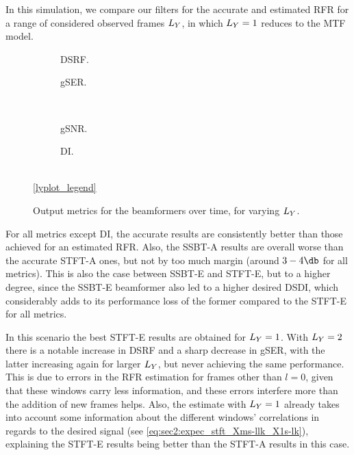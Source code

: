 In this simulation, we compare our filters for the accurate and estimated RFR for a range of considered observed frames $\Ly$, in which $\Ly = 1$ reduces to the MTF model.

\begin{figure}[!t]
	\centering
	\begin{subfigure}{0.49\textwidth}
		\centering
		
		\caption{DSRF.}
		\label{subfig:lineplot__DSRF__iSER_n15__Ly_var}
	\end{subfigure}\hfill
	\begin{subfigure}{0.49\textwidth}
		\centering
		
		\caption{gSER.}
		\label{subfig:lineplot__gSER__iSER_n15__Ly_var}
	\end{subfigure}\\[1em]
	\begin{subfigure}{0.49\textwidth}
		\centering
		
		\caption{gSNR.}
		\label{subfig:lineplot__gSNR__iSER_n15__Ly_var}
	\end{subfigure}\hfill
	\begin{subfigure}{0.49\textwidth}
		\centering
		
		\caption{DI.}
		\label{subfig:lineplot__DI__iSER_n15__Ly_var}
	\end{subfigure}\\[1em]
	\ref*{lyplot_legend}
	\caption{Output metrics for the beamformers over time, for varying $\Ly$.}
	\label{fig:lineplot__iSER_n15__Ly_var}
\end{figure}

For all metrics except DI, the accurate results are consistently better than those achieved for an estimated RFR. Also, the SSBT-A results are overall worse than the accurate STFT-A ones, but not by too much margin (around $3-4\dB$ for all metrics). This is also the case between SSBT-E and STFT-E, but to a higher degree, since the SSBT-E beamformer also led to a higher desired DSDI, which considerably adds to its performance loss of the former compared to the STFT-E for all metrics.

In this scenario the best STFT-E results are obtained for $\Ly = 1$. With $\Ly = 2$ there is a notable increase in DSRF and a sharp decrease in gSER, with the latter increasing again for larger $\Ly$, but never achieving the same performance. This is due to errors in the RFR estimation for frames other than $l = 0$, given that these windows carry less information, and these errors interfere more than the addition of new frames helps. Also, the estimate with $\Ly = 1$ already takes into account some information about the different windows' correlations in regards to the desired signal (see \cref{eq:sec2:expec_stft_Xms-llk_X1s-lk}), explaining the STFT-E results being better than the STFT-A results in this case.

